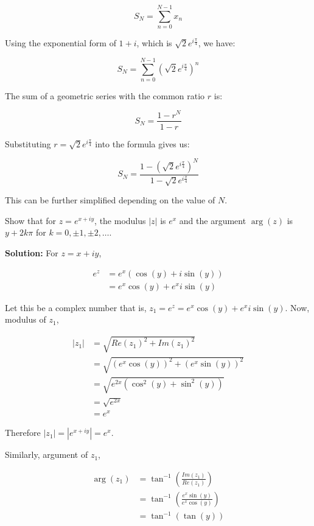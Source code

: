 \documentclass[
	12pt, %
	fleqn, %
	a4paper, %
]{LegrandOrangeBook}
\begin{document}
\[ S_N = \sum_{n=0}^{N-1} x_n \]

Using the exponential form of \( 1 + i \), which is \( \sqrt{2}e^{i\frac{\pi}{4}} \), we have:

\[ S_N = \sum_{n=0}^{N-1} \left(\sqrt{2}e^{i\frac{\pi}{4}}\right)^n \]

The sum of a geometric series with the common ratio \( r \) is:

\[ S_N = \frac{1 - r^N}{1 - r} \]

Substituting \( r = \sqrt{2}e^{i\frac{\pi}{4}} \) into the formula gives us:

\[ S_N = \frac{1 - \left(\sqrt{2}e^{i\frac{\pi}{4}}\right)^N}{1 - \sqrt{2}e^{i\frac{\pi}{4}}} \]

This can be further simplified depending on the value of \( N \).

\begin{exercise}
    Show that for \( z = e^{x+iy} \), the modulus \( |z| \) is \( e^x \) and the argument \( \arg(z) \) is \( y + 2k\pi \) for \( k = 0, \pm 1, \pm 2, \ldots \).
\end{exercise}
\textbf{Solution:}
For \( z = x + iy \),

\begin{align*}
e^{z} &= e^{x}(\cos(y) + i\sin(y)) \\
&= e^{x}\cos(y) + e^{x}i\sin(y)
\end{align*}

Let this be a complex number that is, \( z_1 = e^{z} = e^{x}\cos(y) + e^{x}i\sin(y) \). Now, modulus of \( z_1 \),

\begin{align*}
|z_1| &= \sqrt{Re(z_1)^2 + Im(z_1)^2} \\
&= \sqrt{(e^{x}\cos(y))^2 + (e^{x}\sin(y))^2} \\
&= \sqrt{e^{2x}(\cos^2(y) + \sin^2(y))} \\
&= \sqrt{e^{2x}} \\
&= e^{x}
\end{align*}

Therefore \( |z_1| = |e^{x+iy}| = e^{x} \).

Similarly, argument of \( z_1 \),

\begin{align*}
\arg(z_1) &= \tan^{-1}\left(\frac{Im(z_1)}{Re(z_1)}\right) \\
&= \tan^{-1}\left(\frac{e^{x}\sin(y)}{e^{x}\cos(y)}\right) \\
&= \tan^{-1}(\tan(y))
\end{align*}
\end{document}
